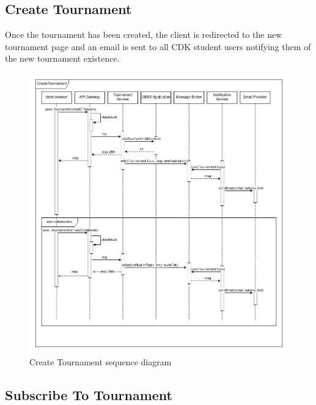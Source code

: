 \subsection{Create Tournament}

Once the tournament has been created, the client is redirected to the new tournament page and an email is sent to all CDK student users notifying them of the new tournament existence.

\begin{figure}[H]
    \centering
    \includegraphics[width=1\linewidth]{misc//Images//UC/UC3.png}
    \caption{Create Tournament sequence diagram}
    \label{fig:enter-label}
\end{figure}
\newpage
\subsection{Subscribe To Tournament}

